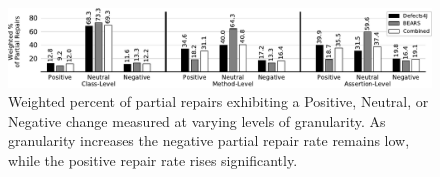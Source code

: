 \documentclass[10pt, conference]{IEEEtran}
\newcommand\todo[1]{\textcolor{red}{#1}}
\newcommand\bears{\textsc{Bears}\xspace}
\begin{document}

\begin{figure}
        \includegraphics[width=\textwidth]{img/weighted_percent.pdf}
        \caption{Weighted percent of partial repairs exhibiting a {\normalfont
            Positive}, {\normalfont Neutral}, or {\normalfont Negative} change
          measured at varying levels of granularity. As granularity increases
          the negative partial repair rate remains low, while the positive
          repair rate rises significantly.}
        \label{fig:fitness}
\end{figure}
\end{document}
